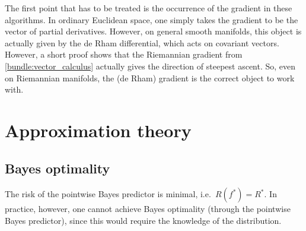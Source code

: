     The first point that has to be treated is the occurrence of the gradient in these algorithms. In ordinary Euclidean space, one simply takes the gradient to be the vector of partial derivatives. However, on general smooth manifolds, this object is actually given by the de Rham differential, which acts on covariant vectors. However, a short proof shows that the Riemannian gradient from \cref{bundle:vector_calculus} actually gives the direction of steepest ascent. So, even on Riemannian manifolds, the (de Rham) gradient is the correct object to work with.


\section{Approximation theory}
\subsection{Bayes optimality}


    \begin{property}
        The risk of the pointwise Bayes predictor is minimal, i.e.~$R(f^*)=R^*$. In practice, however, one cannot achieve Bayes optimality (through the pointwise Bayes predictor), since this would require the knowledge of the distribution.
    \end{property}

